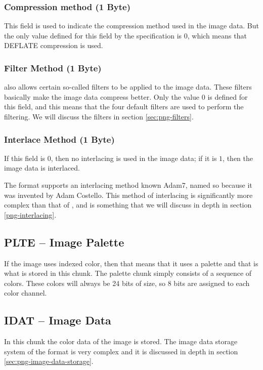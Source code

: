 \subsubsection*{Compression method (1 Byte)}

This field is used to indicate the compression method used in the
image data. But the only value defined for this field by the \png
specification is $0$, which means that DEFLATE compression is used.

\subsubsection*{Filter Method (1 Byte)}

\png also allows certain so-called filters to be applied to the image
data. These filters basically make the image data compress
better. Only the value $0$ is defined for this field, and this means
that the four default filters are used to perform the filtering. We will
discuss the filters in section \ref{sec:png-filters}.

\subsubsection*{Interlace Method (1 Byte)}

If this field is $0$, then no interlacing is used in the image data; if it
is $1$, then the image data is interlaced.

The \png format supports an interlacing method known Adam7, named so
because it was invented by Adam Costello. This method of interlacing
is significantly more complex than that of \gif, and is something
that we will discuss in depth in section \ref{png-interlacing}.

\subsection{PLTE -- Image Palette}

If the image uses indexed color, then that means that it uses a
palette and that is what is stored in this chunk. The palette chunk
simply consists of a sequence of \rgb colors. These colors will always be
24 bits of size, so 8 bits are assigned to each color channel.

\subsection{IDAT -- Image Data}

In this chunk the color data of the image is stored. The image data
storage system of the \png format is very complex and it is discussed
in depth in section \ref{sec:png-image-data-storage}.

